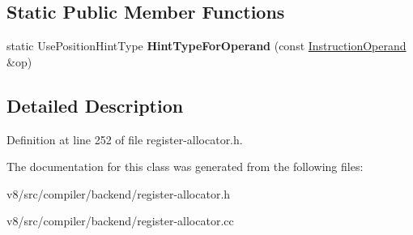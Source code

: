 \subsection*{Static Public Member Functions}
\begin{DoxyCompactItemize}
\item 
\mbox{\label{classv8_1_1internal_1_1compiler_1_1UsePosition_a7dac7388e373c36e922dd3dde55dccf3}} 
static Use\+Position\+Hint\+Type {\bfseries Hint\+Type\+For\+Operand} (const \mbox{\hyperlink{classv8_1_1internal_1_1compiler_1_1InstructionOperand}{Instruction\+Operand}} \&op)
\end{DoxyCompactItemize}


\subsection{Detailed Description}


Definition at line 252 of file register-\/allocator.\+h.



The documentation for this class was generated from the following files\+:\begin{DoxyCompactItemize}
\item 
v8/src/compiler/backend/register-\/allocator.\+h\item 
v8/src/compiler/backend/register-\/allocator.\+cc\end{DoxyCompactItemize}
